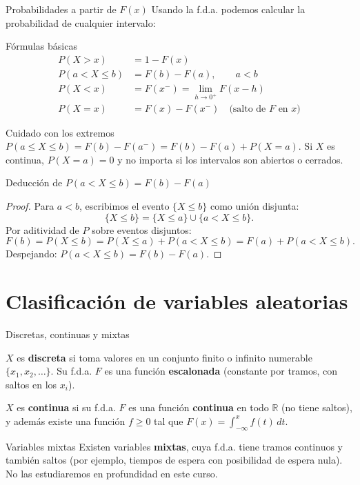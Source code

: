 \documentclass[aspectratio=169,11pt]{beamer}
\begin{document}
\begin{frame}{Probabilidades a partir de $F(x)$}
Usando la f.d.a. podemos calcular la probabilidad de cualquier intervalo:
\begin{block}{Fórmulas básicas}
\begin{align*}
P(X > x) &= 1 - F(x) \\
P(a < X \le b) &= F(b) - F(a), \qquad a<b \\
P(X < x) &= F(x^-) = \lim_{h \to 0^+} F(x-h) \\
P(X = x) &= F(x) - F(x^-) \quad \text{(salto de $F$ en $x$)}
\end{align*}
\end{block}

\begin{alertblock}{Cuidado con los extremos}
$P(a \le X \le b) = F(b) - F(a^-) = F(b) - F(a) + P(X=a)$. Si $X$ es continua, $P(X=a)=0$ y no importa si los intervalos son abiertos o cerrados.
\end{alertblock}
\end{frame}

\begin{frame}{Deducción de $P(a<X\le b) = F(b)-F(a)$}
\begin{proof}
Para $a<b$, escribimos el evento $\{X \le b\}$ como unión disjunta:
$$\{X \le b\} = \{X \le a\} \cup \{a < X \le b\}.$$
Por aditividad de $P$ sobre eventos disjuntos:
$$F(b) = P(X\le b) = P(X \le a) + P(a<X\le b) = F(a) + P(a<X\le b).$$
Despejando: $P(a<X\le b) = F(b) - F(a)$. \qedhere
\end{proof}
\end{frame}

\section{Clasificación de variables aleatorias}

\begin{frame}{Discretas, continuas y mixtas}
\begin{definition}
$X$ es \textbf{discreta} si toma valores en un conjunto finito o infinito numerable $\{x_1, x_2, \dots\}$. Su f.d.a. $F$ es una función \textbf{escalonada} (constante por tramos, con saltos en los $x_i$).
\end{definition}

\begin{definition}
$X$ es \textbf{continua} si su f.d.a. $F$ es una función \textbf{continua} en todo $\mathbb{R}$ (no tiene saltos), y además existe una función $f \ge 0$ tal que $F(x) = \int_{-\infty}^x f(t)\,dt$.
\end{definition}

\begin{block}{Variables mixtas}
Existen variables \textbf{mixtas}, cuya f.d.a. tiene tramos continuos y también saltos (por ejemplo, tiempos de espera con posibilidad de espera nula). No las estudiaremos en profundidad en este curso.
\end{block}
\end{frame}
\end{document}
